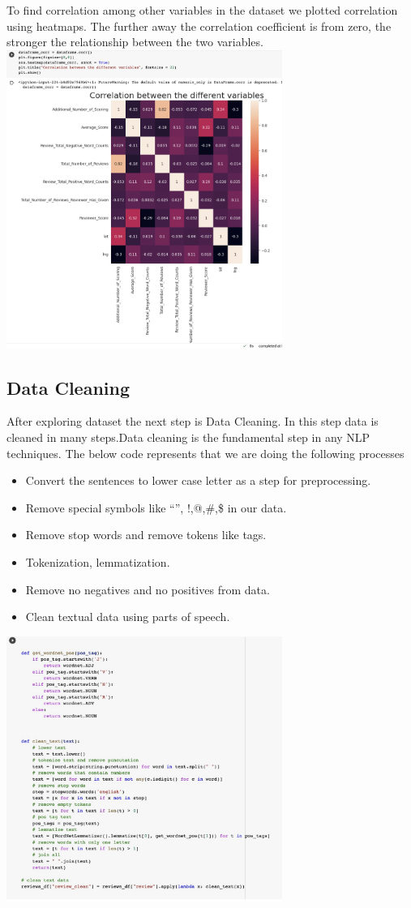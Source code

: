 To find correlation among other variables in the dataset we plotted correlation using heatmaps. The further away the correlation coefficient is from zero, the stronger the relationship between the two variables.\\

\includegraphics[width=9cm, height=9cm \textwidth]{ccorellation.jpeg}
\\
\subsection{Data Cleaning}
After exploring dataset the next step is Data Cleaning. In this step data is cleaned in many steps.Data cleaning is the fundamental step in any NLP techniques. The below code represents that we are doing the following processes
\begin{itemize}

\item Convert the sentences to lower case letter as a step for preprocessing.
\item Remove special symbols like “”, !,@,\#,\$ in our data.
\item Remove stop words and remove tokens like tags.
\item Tokenization, lemmatization.
\item Remove no negatives and no positives from data.
\item Clean textual data using parts of speech.

\end{itemize}
\includegraphics[width=9cm, height=9cm \textwidth]{data cleaning.jpeg}
